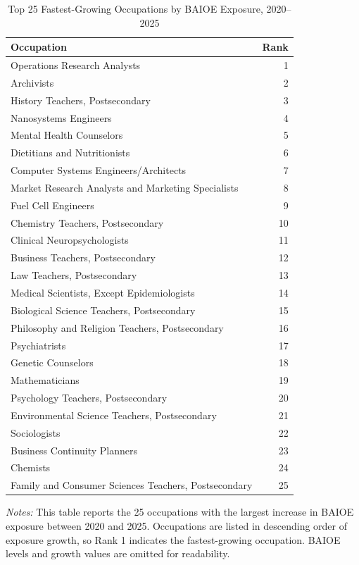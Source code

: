 \begin{table}[htbp]\centering
\caption{Top 25 Fastest-Growing Occupations by BAIOE Exposure, 2020--2025}\label{tab:fastest}
\begin{tabular}{lr}\toprule
Occupation & Rank \\ \midrule
Operations Research Analysts & 1 \\
Archivists & 2 \\
History Teachers, Postsecondary & 3 \\
Nanosystems Engineers & 4 \\
Mental Health Counselors & 5 \\
Dietitians and Nutritionists & 6 \\
Computer Systems Engineers/Architects & 7 \\
Market Research Analysts and Marketing Specialists & 8 \\
Fuel Cell Engineers & 9 \\
Chemistry Teachers, Postsecondary & 10 \\
Clinical Neuropsychologists & 11 \\
Business Teachers, Postsecondary & 12 \\
Law Teachers, Postsecondary & 13 \\
Medical Scientists, Except Epidemiologists & 14 \\
Biological Science Teachers, Postsecondary & 15 \\
Philosophy and Religion Teachers, Postsecondary & 16 \\
Psychiatrists & 17 \\
Genetic Counselors & 18 \\
Mathematicians & 19 \\
Psychology Teachers, Postsecondary & 20 \\
Environmental Science Teachers, Postsecondary & 21 \\
Sociologists & 22 \\
Business Continuity Planners & 23 \\
Chemists & 24 \\
Family and Consumer Sciences Teachers, Postsecondary & 25 \\
\bottomrule\end{tabular}
\begin{minipage}{0.95\linewidth}\footnotesize \textit{Notes:} This table reports the 25 occupations with the largest increase in BAIOE exposure between 2020 and 2025. Occupations are listed in descending order of exposure growth, so Rank 1 indicates the fastest-growing occupation. BAIOE levels and growth values are omitted for readability.\end{minipage}
\end{table}
